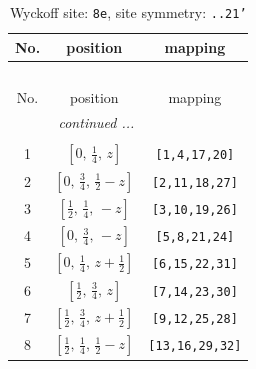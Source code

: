 \documentclass[fleqn,8pt]{jsarticle}
\begin{document}
\begin{longtable}{ccc}
\caption{Wyckoff site: {\tt 8e}, site symmetry: {\tt ..21'}}
 \\
 \hline \hline
No. & position & mapping \\ \hline \endfirsthead

\multicolumn{2}{l}{\tablename\ \thetable{}} \\
 \hline \hline
No. & position & mapping \\ \hline \endhead

 \hline \hline
\multicolumn{2}{r}{\footnotesize\it continued ...} \\ \endfoot

 \hline \hline
\multicolumn{2}{r}{} \\ \endlastfoot

1 & $\left[ 0,\, \frac{1}{4},\, z \right]$ & {\tt [1,4,17,20]} \\ \hline
2 & $\left[ 0,\, \frac{3}{4},\, \frac{1}{2} - z \right]$ & {\tt [2,11,18,27]} \\ \hline
3 & $\left[ \frac{1}{2},\, \frac{1}{4},\, - z \right]$ & {\tt [3,10,19,26]} \\ \hline
4 & $\left[ 0,\, \frac{3}{4},\, - z \right]$ & {\tt [5,8,21,24]} \\ \hline
5 & $\left[ 0,\, \frac{1}{4},\, z + \frac{1}{2} \right]$ & {\tt [6,15,22,31]} \\ \hline
6 & $\left[ \frac{1}{2},\, \frac{3}{4},\, z \right]$ & {\tt [7,14,23,30]} \\ \hline
7 & $\left[ \frac{1}{2},\, \frac{3}{4},\, z + \frac{1}{2} \right]$ & {\tt [9,12,25,28]} \\ \hline
8 & $\left[ \frac{1}{2},\, \frac{1}{4},\, \frac{1}{2} - z \right]$ & {\tt [13,16,29,32]} \\
\end{longtable}
\renewcommand{\arraystretch}{1.2}
\end{document}
